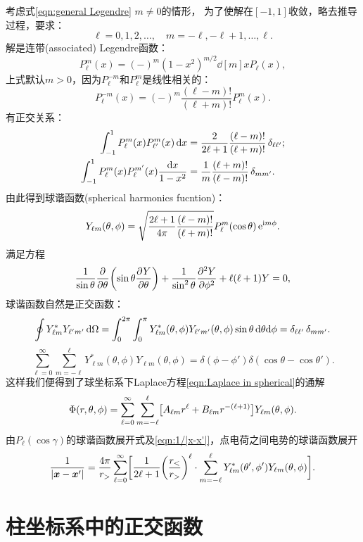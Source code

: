考虑式\eqref{eqn:general Legendre} $m\neq 0$的情形，
为了使解在$[-1,1]$收敛，略去推导过程，要求：
\[
    \ell=0,1,2,\ldots,\quad m=-\ell,-\ell+1,\ldots,\ell.
\]
解是连带(associated) Legendre函数：
\begin{equation}
    P_\ell^m(x)=(-)^m(1-x^2)^{m/2}\dd[m]xP_\ell(x),
\end{equation}
上式默认$m>0$，因为$P_\ell^{-m}$和$P_\ell^m$是线性相关的：
\[
    P_\ell^{-m}(x)=(-)^m\frac{(\ell-m)!}{(\ell+m)!}P_\ell^m(x).
\]
有正交关系：
\begin{align*}
    \int_{-1}^1P_\ell^m(x)P_{\ell'}^m(x)\d x&=\frac2{2\ell+1}\frac{(\ell-m)!}{(\ell+m)!}\vd_{\ell\ell'};\\
    \int_{-1}^1P_\ell^m(x)P_\ell^{m'}(x)\frac{\d x}{1-x^2}&=\frac1m\frac{(\ell+m)!}{(\ell-m)!}\vd_{mm'}.
\end{align*}
由此得到球谐函数(spherical harmonics fucntion)：
\begin{equation}
    Y_{\ell m}(\theta,\phi)=\sqrt{\frac{2\ell+1}{4\pi}\frac{(\ell-m)!}{(\ell+m)!}}P_\ell^m(\cos\theta)\e{\i m\phi}.
\end{equation}
满足方程
\[
    \frac1{\sin\theta}\pp\theta\biggkh{\sin\theta\pv Y\theta}+\frac1{\sin^2\theta}\pv[2]Y\phi+\ell(\ell+1)Y=0,
\]
球谐函数自然是正交函数：
\[
    \oint Y_{\ell m}^\ast Y_{\ell'm'}\d\Omega=\int_0^{2\pi}\int_0^\pi Y_{\ell m}^\ast(\theta,\phi) Y_{\ell'm'}(\theta,\phi)\sin\theta\d\theta\nd\phi=\delta_{\ell\ell'}\vd_{mm'}.
\]
\begin{equation}
    \sum_{\ell=0}^\infty\sum_{m=-\ell}^\ell Y_{\ell m}^*(\theta,\phi)Y_{\ell m}(\theta,\phi)=\delta(\phi-\phi')\delta(\cos\theta-\cos\theta').
\end{equation}
这样我们便得到了球坐标系下Laplace方程\eqref{eqn:Laplace in spherical}的通解
\begin{equation}
    \Phi(r,\theta,\phi)=\sum_{\ell=0}^\infty\sum_{m=-\ell}^\ell\bigfkh{A_{\ell m}r^\ell+B_{\ell m}r^{-(\ell+1)}}Y_{\ell m}(\theta,\phi).
\end{equation}
由$P_\ell(\cos\gamma)$的球谐函数展开式及\eqref{eqn:1/|x-x'|}，点电荷之间电势的球谐函数展开
\begin{equation}
    \label{eqn:1/|x-x'|=YY}
    \frac1{|\bm x-\bm x'|}=\frac{4\pi}{r_>}\sum_{\ell=0}^\infty\biggfkh{\frac1{2\ell+1}\biggkh{\frac{r_<}{r_>}}^\ell\cdot\sum_{m=-\ell}^\ell Y^\ast_{\ell m}(\theta',\phi')Y_{\ell m}(\theta,\phi)}.
\end{equation}

\section{柱坐标系中的正交函数}
\label{sec:laplace equation in cylindrical coordinate}

